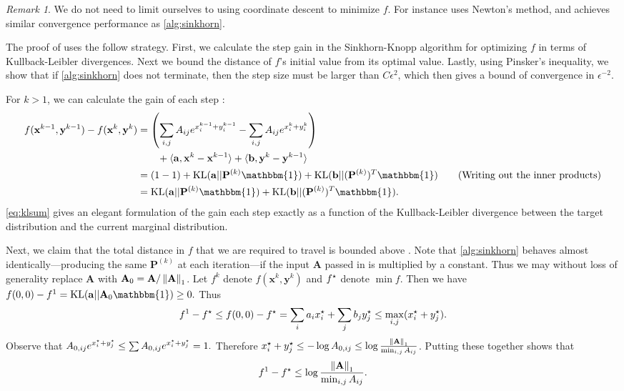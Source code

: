 \documentclass{article}
\renewcommand{\b}{\mathbf}
\newcommand{\one}{\mathbbm{1}}
\newcommand{\KL}{\operatorname{KL}}
\theoremstyle{definition}
\theoremstyle{remark}
\newtheorem{rmk}{Remark}
\begin{document}
\begin{rmk}
  We do not need to limit ourselves to using coordinate descent to minimize $f$.
 For instance
\cite{brauer2017sinkhorn} uses Newton's method, and achieves similar convergence
 performance as \cref{alg:sinkhorn}.
\end{rmk}

The proof of \cite{altschuler2017near} uses the follow strategy. First, we
 calculate the step gain in the Sinkhorn-Knopp algorithm for optimizing $f$ in
 terms of Kullback-Leibler divergences.
 Next we bound the distance of $f$'s initial value from its optimal value.
 Lastly, using Pinsker's inequality, we show that if \cref{alg:sinkhorn} does
 not terminate, then the step size must be larger than $C\epsilon^{2}$, which
 then gives a bound of convergence in $\epsilon^{-2}$.

For $k > 1$, we can
 calculate the gain of each step \cite[Lemma 2]{altschuler2017near}:
\begin{align}
f(\b x^{k-1}, \b y^{k-1}) - f(\b x^{k}, \b y^{k}) &= \pr{\sum_{i,j} A_{ij}e^
{x_i^{k-1} + y_i^{k-1}} - \sum_{i,j} A_{ij}e^
{x_i^{k} + y_i^{k}}} \nonumber\\&\qquad+ \ip{\b a, \b x^k -\b x^{k-1}} + \ip{\b
 b,
 \b y^k - \b y^{k-1}}
 \nonumber\\
&= (1-1) + \KL(\b a || \b P^{(k)}\one) + \KL(\b b || (\b P^{(k)})^T\one)
 \nonumber \tag{Writing out the inner products}\\
&= \KL(\b a || \b P^{(k)}\one) + \KL(\b b || (\b P^{(k)})^T\one). 
\label{eq:klsum}
\end{align}
\eqref{eq:klsum} gives an elegant formulation of the gain each step exactly as a
 function of the Kullback-Leibler divergence between the target distribution and
 the current marginal distribution.

Next, we claim that the total distance in $f$ that we are required to
 travel is bounded above \cite[Lemma 3]{altschuler2017near}. Note that 
\cref{alg:sinkhorn} behaves almost identically---producing the same $\b P^{(k)}$
 at each iteration---if the input $\b A$ passed in is
 multiplied by a constant. Thus we may without loss of generality replace $\b A$
 with
 $\b A_0 = \b A / \norm{\b A}_1$. Let $f^k$ denote $f(\b x^k, \b y^k)$ and
 $f^\star$ denote $\min f$. Then we have $
f(0,0) - f^1 = \KL(\b a || \b A_0\one) \ge 0.
$
Thus \[
f^1 - f^\star \le f(0,0) - f^\star = \sum_{i} a_i x_i^\star + \sum_j b_j y_j^\star \le \max_
{i,j}
(x_i^\star + y_j^\star).
\]
Observe that $
A_{0, ij}e^{x_i^\star + y_j^\star} \le \sum  A_{0, ij}e^{x_i^\star + y_j^\star} = 1.
$
Therefore $x_i^\* + y_j^\* \le -\log A_{0,ij} \le \log \frac{\norm{\b A}_1}{\min_
{i,j} A_{ij}}$. Putting these together shows that \begin{equation}
\label{eq:total}
  f^1 - f^\* \le \log \frac{\norm{\b A}_1}{\min_
{i,j} A_{ij}}.
\end{equation}
\end{document}
